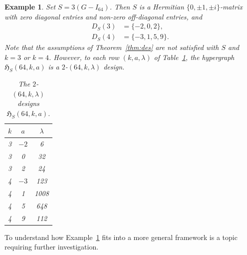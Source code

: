 \documentclass[11pt]{article}
\newtheorem{example}[theorem]{Example}
\begin{document}
\begin{example}
\label{ex:hoggar}
Set $S=3(G-I_{64})$. 
Then $S$ is a Hermitian $\{0,\pm1,\pm i\}$-matrix with zero diagonal entries and non-zero off-diagonal entries, and
\begin{align*}
D_S(3)&=\{-2,0,2\},\\
D_S(4)&=\{-3,1,5,9\}.
\end{align*}
Note that the assumptions of Theorem~\ref{thm:des} are not satisfied with $S$ and $k=3$ or $k=4$.
However, to each row $(k,a,\lambda)$ of Table~\ref{tab:hoggar}, the hypergraph $\mathfrak H_S(64,k,a)$ is a $2$-$(64,k,\lambda)$ design. 
\begin{table}[h!]
    \centering
    \begin{tabular}{c|c|c}
         $k$ & $a$ & $\lambda$ \\
        \hline
        3 & $-2$ & 6\\
        3 & 0 & 32 \\
        3 & 2 & 24\\
        4 & $-3$ & 123\\
        4 & 1 & 1008\\
        4 & 5 & 648\\
        4 & 9 & 112
    \end{tabular}
    \caption{The $2$-$(64,k,\lambda)$ designs $\mathfrak H_{S}(64,k,a)$.}
    \label{tab:hoggar}
\end{table}
\end{example}


To understand how Example~\ref{ex:hoggar} fits into a more general framework is a topic requiring further investigation.  
\end{document}
